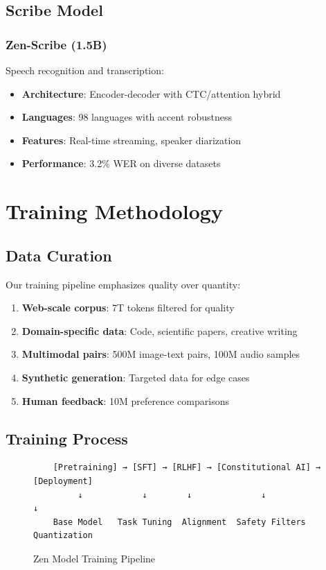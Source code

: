 \documentclass[11pt,a4paper]{article}
\begin{document}
\subsection{Scribe Model}

\subsubsection{Zen-Scribe (1.5B)}
Speech recognition and transcription:
\begin{itemize}
    \item \textbf{Architecture}: Encoder-decoder with CTC/attention hybrid
    \item \textbf{Languages}: 98 languages with accent robustness
    \item \textbf{Features}: Real-time streaming, speaker diarization
    \item \textbf{Performance}: 3.2\% WER on diverse datasets
\end{itemize}

\section{Training Methodology}

\subsection{Data Curation}

Our training pipeline emphasizes quality over quantity:
\begin{enumerate}
    \item \textbf{Web-scale corpus}: 7T tokens filtered for quality
    \item \textbf{Domain-specific data}: Code, scientific papers, creative writing
    \item \textbf{Multimodal pairs}: 500M image-text pairs, 100M audio samples
    \item \textbf{Synthetic generation}: Targeted data for edge cases
    \item \textbf{Human feedback}: 10M preference comparisons
\end{enumerate}

\subsection{Training Process}

\begin{figure}[H]
\centering
\begin{verbatim}
    [Pretraining] → [SFT] → [RLHF] → [Constitutional AI] → [Deployment]
         ↓            ↓        ↓              ↓                  ↓
    Base Model   Task Tuning  Alignment  Safety Filters   Quantization
\end{verbatim}
\caption{Zen Model Training Pipeline}
\end{figure}
\end{document}
